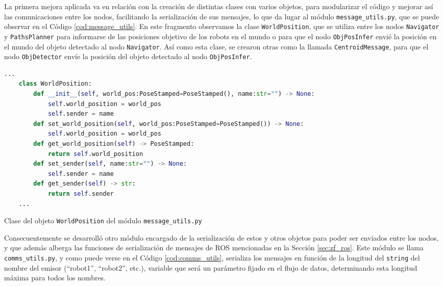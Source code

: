 La primera mejora aplicada va en relación con la creación de distintas clases
con varios objetos, para modularizar el código y mejorar así las comunicaciones
entre los nodos, facilitando la serialización de sus mensajes, lo que da lugar
al módulo \texttt{message\_utils.py}, que se puede observar en el Código
\ref{cod:message_utils}.
En este fragmento observamos la clase \verb|WorldPosition|, que se utiliza
entre los nodos \verb|Navigator| y \verb|PathsPlanner| para informarse de
las posiciones objetivo de los robots en el mundo o para que el nodo
\verb|ObjPosInfer| envié la posición en el mundo del objeto detectado al nodo
\verb|Navigator|.
Así como esta clase, se crearon otras como la llamada \verb|CentroidMessage|,
para que el nodo \verb|ObjDetector| envíe la posición del objeto detectado al
nodo \verb|ObjPosInfer|.
\\

\begin{code}[h!]
  \begin{lstlisting}[language=Python]
    ...
    class WorldPosition:
        def __init__(self, world_pos:PoseStamped=PoseStamped(), name:str="") -> None:
            self.world_position = world_pos
            self.sender = name
        def set_world_position(self, world_pos:PoseStamped=PoseStamped()) -> None:
            self.world_position = world_pos
        def get_world_position(self) -> PoseStamped:
            return self.world_position
        def set_sender(self, name:str="") -> None:
            self.sender = name
        def get_sender(self) -> str:
            return self.sender
    ...
  \end{lstlisting}
\caption[Clase del objeto \texttt{WorldPosition} del módulo \texttt{message\_utils.py}]{Clase del objeto \texttt{WorldPosition} del módulo \texttt{message\_utils.py}}
\label{cod:message_utils}
\end{code}

Consecuentemente se desarrolló otro módulo encargado de la serialización de
estos y otros objetos para poder ser enviados entre los nodos, y que además
alberga las funciones de serialización de mensajes de ROS mencionadas en la
Sección \ref{sec:zf_ros}.
Este módulo se llama \texttt{comms\_utils.py}, y como puede verse en el Código
\ref{cod:comms_utils}, serializa los mensajes en función de la longitud del
\texttt{string} del nombre del emisor (``robot1'', ``robot2'', etc.), variable
que será un parámetro fijado en el flujo de datos, determinando esta longitud
máxima para todos los nombres.
\\


